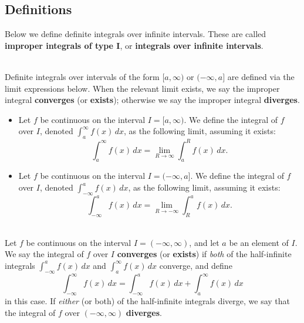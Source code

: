 \subsection*{Definitions}
\begin{namedtheorem} Below we define definite integrals over infinite intervals. These are called {\bf improper integrals of type I}, or {\bf integrals over infinite intervals}.
\begin{description}[topsep=0pt, itemsep=0pt]
  \item[Half-infinite intervals]\ \\ Definite integrals over intervals of the form $[a,\infty)$ or $(-\infty, a]$ are defined via the limit expressions below. When the relevant limit exists, we say the improper integral {\bf converges} (or {\bf exists}); otherwise we say the improper integral {\bf diverges}.
  \begin{itemize}[topsep=0pt, itemsep=0pt]
    \item Let $f$ be continuous on the interval $I=[a,\infty)$. We define the integral of $f$ over $I$, denoted $\displaystyle\int_a^\infty f(x)\, dx$, as the following limit, assuming it exists:
    \[
    \int_a^\infty f(x)\, dx=\lim_{R\to\infty}\int_a^R f(x)\, dx.
    \]
    \item Let $f$ be continuous on the interval $I=(-\infty,a]$. We define the integral of $f$ over $I$, denoted $\displaystyle\int_{-\infty}^a f(x)\, dx$, as the following limit, assuming it exists:
    \[
    \int_{-\infty}^af(x)\, dx=\lim_{R\to-\infty}\int_R^{a} f(x)\, dx.
    \]
  \end{itemize}
  \item[Real line]\ \\ Let $f$ be continuous on the interval $I=(-\infty,\infty)$, and let $a$ be an element of $I$. We say the integral of $f$ over $I$ {\bf converges} (or {\bf exists}) if {\em both} of the half-infinite integrals $\displaystyle\int_{-\infty}^a f(x)\, dx$ and $\displaystyle\int_a^{\infty}f(x)\, dx$ converge, and define
  \[
  \int_{-\infty}^\infty f(x)\, dx=\int_{-\infty}^a f(x)\, dx+\int_a^{\infty}f(x)\, dx
  \]
  in this case. If {\em either} (or both) of the half-infinite integrals diverge, we say that the integral of $f$ over $(-\infty, \infty)$ {\bf diverges}.
\end{description}
\end{namedtheorem}
